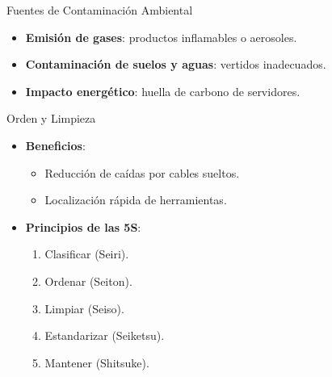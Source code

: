 \documentclass{beamer}
\begin{document}

\begin{frame}{Fuentes de Contaminación Ambiental}
    \begin{itemize}
        \item \textbf{Emisión de gases}: productos inflamables o aerosoles.
        \item \textbf{Contaminación de suelos y aguas}: vertidos inadecuados.
        \item \textbf{Impacto energético}: huella de carbono de servidores.
    \end{itemize}
\end{frame}


\begin{frame}{Orden y Limpieza}
    \begin{itemize}
        \item \textbf{Beneficios}:
        \begin{itemize}
            \item Reducción de caídas por cables sueltos.
            \item Localización rápida de herramientas.
        \end{itemize}
        \item \textbf{Principios de las 5S}:
        \begin{enumerate}
            \item Clasificar (Seiri).
            \item Ordenar (Seiton).
            \item Limpiar (Seiso).
            \item Estandarizar (Seiketsu).
            \item Mantener (Shitsuke).
        \end{enumerate}
    \end{itemize}
\end{frame}
\end{document}
